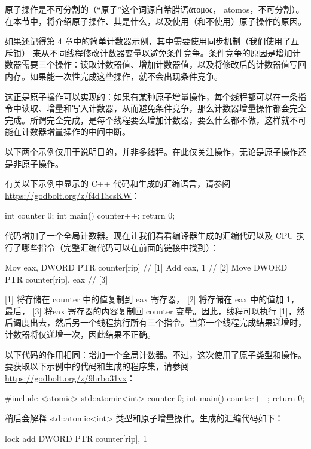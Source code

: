 
原子操作是不可分割的（“原子”这个词源自希腊语ἄτομος， atomos，不可分割）。在本节中，将介绍原子操作、其是什么，以及使用（和不使用）原子操作的原因。


如果还记得第 4 章中的简单计数器示例，其中需要使用同步机制（我们使用了互斥锁） 来从不同线程修改计数器变量以避免条件竞争。条件竞争的原因是增加计数器需要三个操作：读取计数器值、增加计数器值，以及将修改后的计数器值写回内存。如果能一次性完成这些操作，就不会出现条件竞争。

这正是原子操作可以实现的：如果有某种原子增量操作，每个线程都可以在一条指令中读取、增量和写入计数器，从而避免条件竞争，那么计数器增量操作都会完全完成。所谓完全完成，是每个线程要么增加计数器，要么什么都不做，这样就不可能在计数器增量操作的中间中断。

以下两个示例仅用于说明目的，并非多线程。在此仅关注操作，无论是原子操作还是非原子操作。

有关以下示例中显示的 C++ 代码和生成的汇编语言，请参阅\url{https://godbolt.org/z/f4dTacsKW}：

\begin{cpp}
int counter {0};
int main() {
    counter++;
    return 0;
}
\end{cpp}

代码增加了一个全局计数器。现在让我们看看编译器生成的汇编代码以及 CPU 执行了哪些指令（完整汇编代码可以在前面的链接中找到）：

\begin{cpp}
Mov eax, DWORD PTR counter[rip] // [1]
Add eax, 1 // [2]
Move DWORD PTR counter[rip], eax // [3]
\end{cpp}

[1] 将存储在 counter 中的值复制到 eax 寄存器， [2] 将存储在 eax 中的值加 1，最后， [3] 将eax 寄存器的内容复制回 counter 变量。因此，线程可以执行 [1]，然后调度出去，然后另一个线程执行所有三个指令。当第一个线程完成结果递增时，计数器将仅递增一次，因此结果不正确。

以下代码的作用相同：增加一个全局计数器。不过，这次使用了原子类型和操作。要获取以下示例中的代码和生成的程序集，请参阅 \url{https://godbolt.org/z/9hrbo31vx}：

\begin{cpp}
#include <atomic>
std::atomic<int> counter {0};
int main() {
    counter++;
    return 0;
}
\end{cpp}

稍后会解释 std::atomic<int> 类型和原子增量操作。生成的汇编代码如下：

\begin{cpp}
lock add DWORD PTR counter[rip], 1
\end{cpp}

